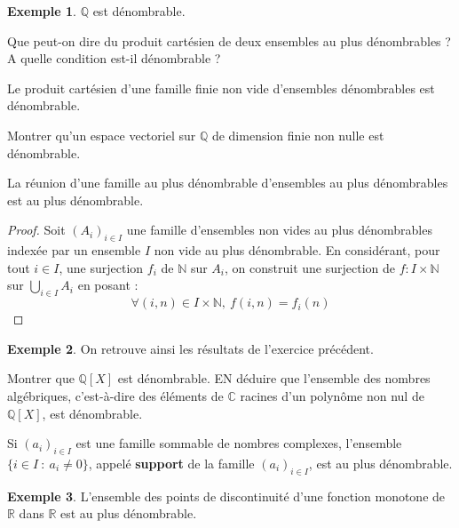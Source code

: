 \documentclass[french]{article}
\newcommand{\N}{\mathbb{N}}
\newcommand{\Q}{\mathbb{Q}}
\newcommand{\R}{\mathbb{R}}
\newcommand{\C}{\mathbb{C}}
\theoremstyle{plain}
\theoremstyle{definition}
\newtheorem*{ex}{Exemple}
\theoremstyle{remark}
\begin{document}
\begin{ex}
	$\Q$ est dénombrable.
\end{ex}

\begin{exo}
	Que peut-on dire du produit cartésien de deux ensembles au plus dénombrables ? A quelle condition est-il dénombrable ?
\end{exo}

\begin{cor}%
	Le produit cartésien d'une famille finie non vide d'ensembles dénombrables est dénombrable.
\end{cor}

\begin{exo}
	Montrer qu'un espace vectoriel sur $\Q$ de dimension finie non nulle est dénombrable.
\end{exo}

\begin{cor}%
	La réunion d'une famille au plus dénombrable d'ensembles au plus dénombrables est au plus dénombrable.
\end{cor}
\begin{proof}
	Soit $(A_i)_{i\in I}$ une famille d'ensembles non vides au plus dénombrables indexée par un ensemble $I$ non vide au plus dénombrable. En considérant, pour tout $i\in I$, une surjection $f_i$ de $\N$ sur $A_i$, on construit une surjection de $f:I\times\N$ sur $\displaystyle\bigcup_{i\in I}A_i$ en posant : $$\forall (i,n)\in I\times\N,\ f(i,n)=f_i(n)$$
\end{proof}

\begin{ex}
	On retrouve ainsi les résultats de l'exercice précédent.
\end{ex}

\begin{exo}
	Montrer que $\Q[X]$ est dénombrable. EN déduire que l'ensemble des nombres algébriques, c'est-à-dire des éléments de $\C$ racines d'un polynôme non nul de $\Q[X]$, est dénombrable.
\end{exo}

\begin{prop}%
	Si $(a_i)_{i\in I}$ est une famille sommable de nombres complexes, l'ensemble $\{i\in I\ : \ a_i\ne 0\}$, appelé \textbf{support} de la famille $(a_i)_{i\in I}$, est au plus dénombrable.
\end{prop}

\begin{ex}
	L'ensemble des points de discontinuité d'une fonction monotone de $\R$ dans $\R$ est au plus dénombrable.
\end{ex}
\end{document}
